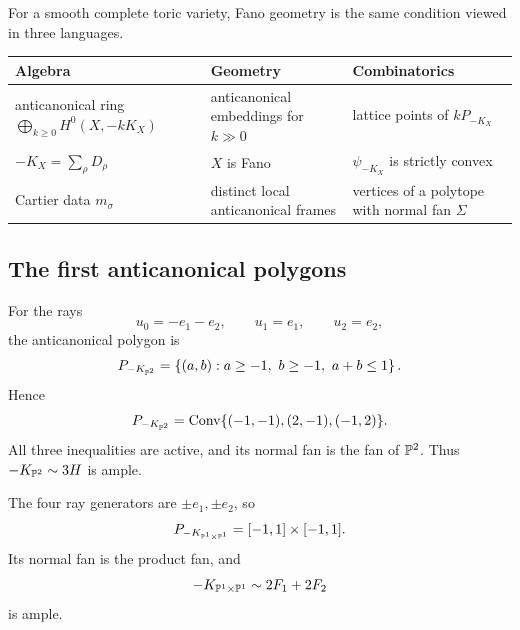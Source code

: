 \begin{threedictionaries}
For a smooth complete toric variety, Fano geometry is the same
condition viewed in three languages.

\medskip

\begin{center}
\small
\begin{tabularx}{\linewidth}{@{}
  >{\raggedright\arraybackslash}X
  >{\raggedright\arraybackslash}X
  >{\raggedright\arraybackslash}X@{}}
\toprule
\textbf{Algebra}
&
\textbf{Geometry}
&
\textbf{Combinatorics}
\\
\midrule
anticanonical ring
\(\bigoplus_{k\geq0}H^0(X,-kK_X)\)
&
anticanonical embeddings for \(k\gg0\)
&
lattice points of \(kP_{-K_X}\)
\\
\(-K_X=\sum_\rho D_\rho\)
&
\(X\) is Fano
&
\(\psi_{-K_X}\) is strictly convex
\\
Cartier data \(m_\sigma\)
&
distinct local anticanonical frames
&
vertices of a polytope with normal fan \(\Sigma\)
\\
\bottomrule
\end{tabularx}
\end{center}
\end{threedictionaries}

\subsection{The first anticanonical polygons}

\begin{example}
For the rays
\[
u_0=-e_1-e_2,
\qquad
u_1=e_1,
\qquad
u_2=e_2,
\]
the anticanonical polygon is
\[
P_{-K_{\mathbb{P}^2}}
=
\left\{
(a,b):a\geq-1,\ b\geq-1,\ a+b\leq1
\right\}.
\]
Hence
\[
P_{-K_{\mathbb{P}^2}}
=
\operatorname{Conv}\{(-1,-1),(2,-1),(-1,2)\}.
\]
All three inequalities are active, and its normal fan is the fan of
\(\mathbb{P}^2\). Thus \(-K_{\mathbb{P}^2}\sim3H\) is ample.
\end{example}

\begin{example}
The four ray generators are \(\pm e_1,\pm e_2\), so
\[
P_{-K_{\mathbb{P}^1\times\mathbb{P}^1}}
=
[-1,1]\times[-1,1].
\]
Its normal fan is the product fan, and
\[
-K_{\mathbb{P}^1\times\mathbb{P}^1}
\sim2F_1+2F_2
\]
is ample.
\end{example}

